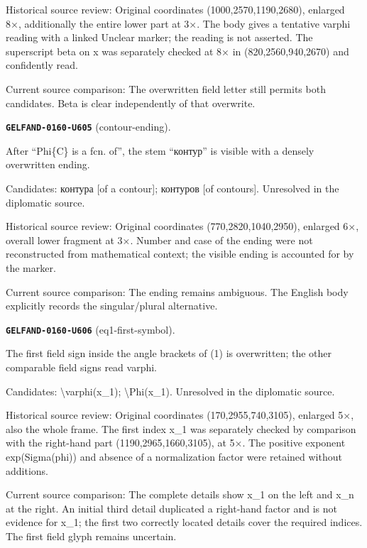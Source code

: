 Historical source review: Original coordinates (1000,2570,1190,2680), enlarged 8×, additionally the entire lower part at 3×. The body gives a tentative varphi reading with a linked Unclear marker; the reading is not asserted. The superscript beta on x was separately checked at 8× in (820,2560,940,2670) and confidently read.\par
Current source comparison: The overwritten field letter still permits both candidates. Beta is clear independently of that overwrite.\par\medskip
\par\noindent\leavevmode{}\label{GELFAND-0160-U605}\label{GELFAND-P001483:contour-ending}\textbf{\texttt{GELFAND-0160-U605}} (contour-ending).\nopagebreak[4]\par
After “Phi\{C\} is a fcn. of”, the stem “контур” is visible with a densely overwritten ending.\par
Candidates: контура [of a contour]; контуров [of contours]. Unresolved in the diplomatic source.\par
Historical source review: Original coordinates (770,2820,1040,2950), enlarged 6×, overall lower fragment at 3×. Number and case of the ending were not reconstructed from mathematical context; the visible ending is accounted for by the marker.\par
Current source comparison: The ending remains ambiguous. The English body explicitly records the singular/plural alternative.\par\medskip
\par\noindent\leavevmode{}\label{GELFAND-0160-U606}\label{GELFAND-P001483:eq1-first-symbol}\textbf{\texttt{GELFAND-0160-U606}} (eq1-first-symbol).\nopagebreak[4]\par
The first field sign inside the angle brackets of (1) is overwritten; the other comparable field signs read varphi.\par
Candidates: \textbackslash{}varphi(x\_1); \textbackslash{}Phi(x\_1). Unresolved in the diplomatic source.\par
Historical source review: Original coordinates (170,2955,740,3105), enlarged 5×, also the whole frame. The first index x\_1 was separately checked by comparison with the right-hand part (1190,2965,1660,3105), at 5×. The positive exponent exp(Sigma(phi)) and absence of a normalization factor were retained without additions.\par
Current source comparison: The complete details show x\_1 on the left and x\_n at the right. An initial third detail duplicated a right-hand factor and is not evidence for x\_1; the first two correctly located details cover the required indices. The first field glyph remains uncertain.\par\medskip
